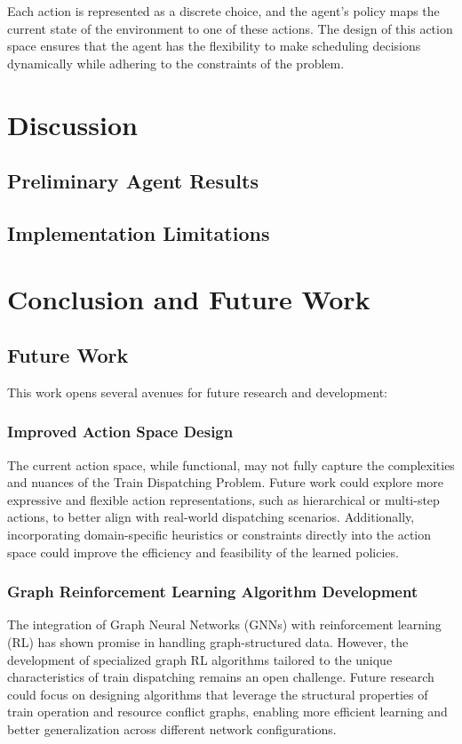 \documentclass[runningheads]{llncs}
\begin{document}
Each action is represented as a discrete choice, and the agent's policy maps the current state of the environment to one of these actions. The design of this action space ensures that the agent has the flexibility to make scheduling decisions dynamically while adhering to the constraints of the problem.



\section{Discussion}
\label{sse:discussion}
\subsection{Preliminary Agent Results}

\subsection{Implementation Limitations}

\section{Conclusion and Future Work}
\label{sse:conclusion}

\subsection{Future Work}
\label{sss:future_work}
This work opens several avenues for future research and development:

\subsubsection{Improved Action Space Design}
The current action space, while functional, may not fully capture the complexities and nuances of the Train Dispatching Problem. 
Future work could explore more expressive and flexible action representations, such as hierarchical or multi-step actions, to better align with real-world dispatching scenarios. 
Additionally, incorporating domain-specific heuristics or constraints directly into the action space could improve the efficiency and feasibility of the learned policies.

\subsubsection{Graph Reinforcement Learning Algorithm Development}
The integration of Graph Neural Networks (GNNs) with reinforcement learning (RL) has shown promise in handling graph-structured data. 
However, the development of specialized graph RL algorithms tailored to the unique characteristics of train dispatching remains an open challenge. 
Future research could focus on designing algorithms that leverage the structural properties of train operation and resource conflict graphs, enabling more efficient learning and better generalization across different network configurations.
\end{document}
